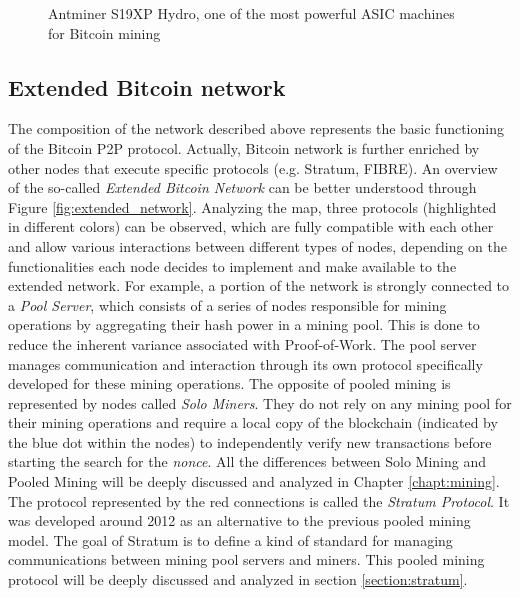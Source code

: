 \begin{figure}[!ht]
\begin{minipage}[t]{0.35\textwidth}
    \caption{Antminer S19XP Hydro, one of the most powerful ASIC machines for Bitcoin mining}
    \label{fig:asic}
    \end{minipage}
\end{figure}


\subsection{Extended Bitcoin network}

The composition of the network described above represents the basic functioning of the Bitcoin P2P protocol. Actually, Bitcoin network is further enriched by other nodes that execute specific protocols (e.g. Stratum, FIBRE). An overview of the so-called \textit{Extended Bitcoin Network} can be better understood through Figure \ref{fig:extended_network}.
Analyzing the map, three protocols (highlighted in different colors) can be observed, which are fully compatible with each other and allow various interactions between different types of nodes, depending on the functionalities each node decides to implement and make available to the extended network.
For example, a portion of the network is strongly connected to a \textit{Pool Server}, which consists of a series of nodes responsible for mining operations by aggregating their hash power in a mining pool. This is done to reduce the inherent variance associated with Proof-of-Work. The pool server manages communication and interaction through its own protocol specifically developed for these mining operations. The opposite of pooled mining is represented by nodes called \textit{Solo Miners}. They do not rely on any mining pool for their mining operations and require a local copy of the blockchain (indicated by the blue dot within the nodes) to independently verify new transactions before starting the search for the \textit{nonce}. All the differences between Solo Mining and Pooled Mining will be deeply discussed and analyzed in Chapter \ref{chapt:mining}. 
The protocol represented by the red connections is called the \textit{Stratum Protocol}. It was developed around 2012 as an alternative to the previous pooled mining model. The goal of Stratum is to define a kind of standard for managing communications between mining pool servers and miners. This pooled mining protocol will be deeply discussed and analyzed in section \ref{section:stratum}.
